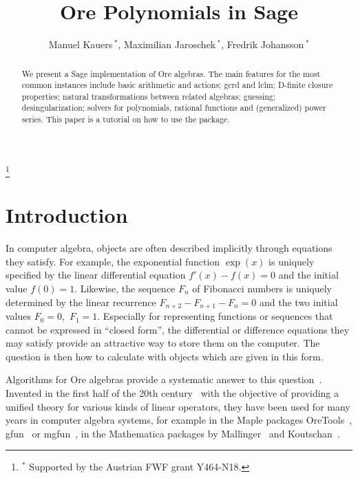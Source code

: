 \documentclass{amsart}
\begin{document}
 \author[Manuel Kauers, Maximilian Jaroschek, Fredrik Johansson]
   {Manuel Kauers\,$^\ast$, Maximilian Jaroschek\,$^\ast$, Fredrik Johansson\,$^\ast$}
 \address{Manuel Kauers, Research Institute for Symbolic Computation (RISC), J. Kepler University Linz, Austria}
 \address{Maximilian Jaroschek, Research Institute for Symbolic Computation (RISC), J. Kepler University Linz, Austria}
 \address{Fredrik Johansson, Research Institute for Symbolic Computation (RISC), J. Kepler University Linz, Austria}
 \thanks{$^\ast$ Supported by the Austrian FWF grant Y464-N18.}

 \title{Ore Polynomials in Sage}

 \begin{abstract}
We present a Sage implementation of Ore algebras. The main features for the most
common instances include basic arithmetic and actions; gcrd and lclm; D-finite
closure properties; natural transformations between related algebras; guessing;
desingularization; solvers for polynomials, rational functions and (generalized)
power series. This paper is a tutorial on how to use the package.
 \end{abstract}

 \maketitle


\section{Introduction}

In computer algebra, objects are often described implicitly through equations
they satisfy. For example, the exponential function $\exp(x)$ is uniquely
specified by the linear differential equation $f'(x)-f(x)=0$ and the initial
value $f(0)=1$.  Likewise, the sequence $F_n$ of Fibonacci numbers is uniquely
determined by the linear recurrence $F_{n+2}-F_{n+1}-F_n=0$ and the two initial
values $F_0=0$,~$F_1=1$.  Especially for representing functions or sequences
that cannot be expressed in ``closed form'', the differential or difference
equations they may satisfy provide an attractive way to store them on the
computer. The question is then how to calculate with objects which are given in
this form.

Algorithms for Ore algebras provide a systematic answer to this
question~\cite{bronstein96,chyzak98}.  Invented in the first half of the 20th
century~\cite{ore33} with the objective of providing a unified theory for
various kinds of linear operators, they have been used for many years in
computer algebra systems, for example in the Maple packages
OreTools~\cite{abramov03}, gfun~\cite{salvy94} or mgfun~\cite{chyzak98a}, in the
Mathematica packages by Mallinger~\cite{mallinger96} and
Koutschan~\cite{koutschan10c,koutschan09}.
\end{document}
